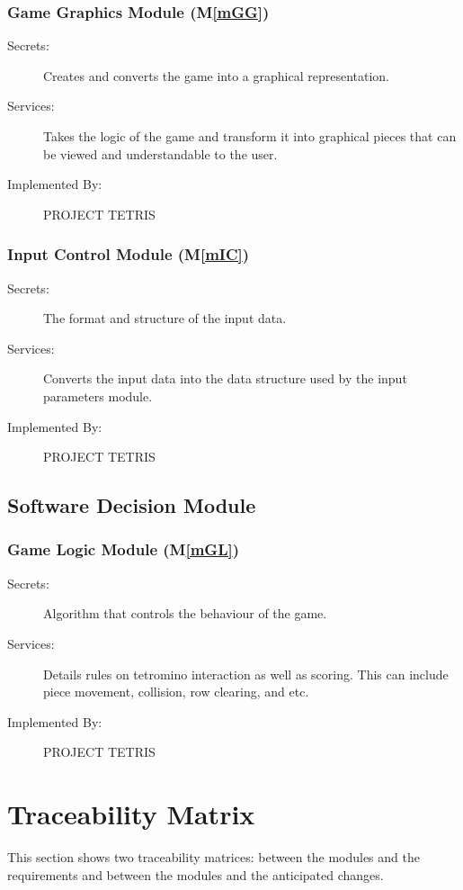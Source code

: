 \documentclass[12pt, titlepage]{article}
\newcommand{\mref}[1]{M\ref{#1}}
\begin{document}
\subsubsection{Game Graphics Module (\mref{mGG})}
\begin{description}
\item[Secrets:] Creates and converts the game into a graphical representation.
\item[Services:] Takes the logic of the game and transform it into graphical pieces that can be viewed
and understandable to the user.
\item[Implemented By:] PROJECT TETRIS
\end{description}

\subsubsection{Input Control Module (\mref{mIC})}
\begin{description}
\item[Secrets:]The format and structure of the input data.
\item[Services:] Converts the input data into the data structure used by the
  input parameters module.
\item[Implemented By:] PROJECT TETRIS
\end{description}

\subsection{Software Decision Module}
\subsubsection{Game Logic Module  (\mref{mGL})}
\begin{description}
\item[Secrets:] Algorithm that controls the behaviour of the game.
\item[Services:] Details rules on tetromino interaction as well as scoring. This can include
piece movement, collision, row clearing, and etc.
\item[Implemented By:] PROJECT TETRIS
\end{description}


\section{Traceability Matrix} \label{SecTM}
This section shows two traceability matrices: between the modules and the
requirements and between the modules and the anticipated changes.
\end{document}
